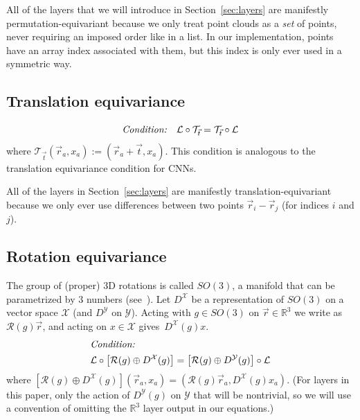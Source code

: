 \documentclass{article}
\begin{document}
All of the layers that we will introduce in Section~\ref{sec:layers} are manifestly permutation-equivariant because we only treat point clouds as a {\em set} of points, never requiring an imposed order like in a list.  In our implementation, points have an array index associated with them, but this index is only ever used in a symmetric way.
\clearpage
\subsection{Translation equivariance} 
\[\text{{\em Condition:}} \quad \mathcal{L} \circ \mathcal{T}_{\vec{t}} = \mathcal{T}_{\vec{t}} \circ \mathcal{L}\]
where $\mathcal{T}_{\vec{t}}(\vec{r}_a, x_{a}) := (\vec{r}_a + \vec{t}, x_{a})$.  This condition is analogous to the translation equivariance condition for CNNs.

All of the layers in Section~\ref{sec:layers} are manifestly translation-equivariant because we only ever use differences between two points $\vec{r}_i - \vec{r}_j$ (for indices $i$ and $j$).

\subsection{Rotation equivariance}

The group of (proper) 3D rotations is called $SO(3)$, a manifold that can be parametrized by 3 numbers (see~\citet{goodman1998representations}).  Let $D^\mathcal{X}$ be a representation of $SO(3)$ on a vector space $\mathcal{X}$ (and $D^{\mathcal{Y}}$ on $\mathcal{Y}$).  Acting with $g \in SO(3)$ on $\vec{r} \in \mathbb{R}^3$ we write as $\mathcal{R}(g)\vec{r}$, and acting on $x \in \mathcal{X}$ gives~$D^{\mathcal{X}}(g)x$.
\begin{equation}\label{eq:rot_equiv}
\begin{split}
&\text{{\em Condition:}} \\ 
&\mathcal{L} \circ \left[\mathcal{R}(g) \oplus D^{\mathcal{X}}(g)\right] = \left[\mathcal{R}(g) \oplus D^{\mathcal{Y}}(g)\right] \circ \mathcal{L}
\end{split}
\end{equation}
where $\left[\mathcal{R}(g) \oplus D^{\mathcal{X}}(g)\right]\left(\vec{r}_a, x_a\right) = \left(\mathcal{R}(g)\vec{r}_a, D^\mathcal{X}(g) x_a \right)$.
(For layers in this paper, only the action of $D^\mathcal{Y}(g)$ on $\mathcal{Y}$ that will be nontrivial, so we will use a convention of omitting the $\mathbb{R}^3$ layer output in our equations.)
\end{document}
